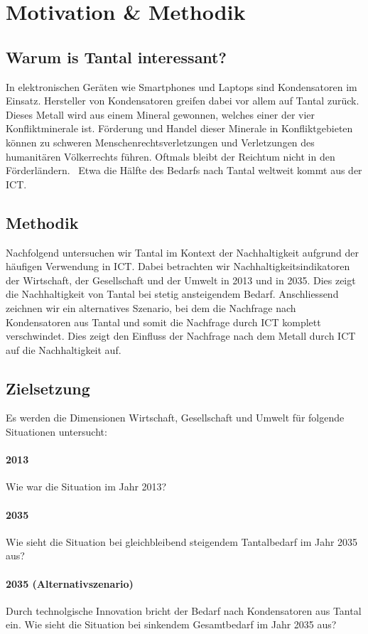 \section{Motivation \& Methodik}\label{sec:motivation}

\subsection{Warum is Tantal interessant?}

In elektronischen Geräten wie Smartphones und Laptops sind Kondensatoren im Einsatz.
Hersteller von Kondensatoren greifen dabei vor allem auf Tantal zurück. Dieses Metall wird aus einem Mineral gewonnen, welches einer der vier Konfliktminerale ist.
Förderung und Handel dieser Minerale in Konfliktgebieten können zu schweren Menschenrechtsverletzungen und Verletzungen des humanitären Völkerrechts führen. Oftmals bleibt der Reichtum nicht in den Förderländern.~\cite{conflict_minerals}
Etwa die Hälfte des Bedarfs nach Tantal weltweit kommt aus der ICT.~\cite{why_tantal}

\subsection{Methodik}

Nachfolgend untersuchen wir Tantal im Kontext der Nachhaltigkeit aufgrund der häufigen Verwendung in ICT. Dabei betrachten wir Nachhaltigkeitsindikatoren der Wirtschaft, der Gesellschaft und der Umwelt in 2013 und in 2035. Dies zeigt die Nachhaltigkeit von Tantal bei stetig ansteigendem Bedarf.
Anschliessend zeichnen wir ein alternatives Szenario, bei dem die Nachfrage nach Kondensatoren aus Tantal und somit die Nachfrage durch ICT komplett verschwindet. Dies zeigt den Einfluss der Nachfrage nach dem Metall durch ICT auf die Nachhaltigkeit auf.

\subsection{Zielsetzung}

Es werden die Dimensionen Wirtschaft, Gesellschaft und Umwelt für folgende Situationen untersucht:

\paragraph{2013}
Wie war die Situation im Jahr 2013?
\paragraph{2035}
Wie sieht die Situation bei gleichbleibend steigendem Tantalbedarf im Jahr 2035 aus?
\paragraph{2035 (Alternativszenario)}
Durch technolgische Innovation bricht der Bedarf nach Kondensatoren aus Tantal ein. Wie sieht die Situation bei sinkendem Gesamtbedarf im Jahr 2035 aus?
